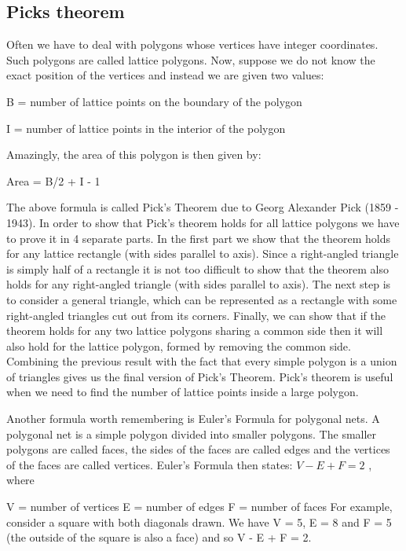 \documentclass[10pt,letterpaper,twocolumn,twosided]{article}
\newcommand{\codigofuente}[1]{

\dotfill
}
\begin{document}
\codigofuente{src/geom/circledistance.cpp}

\subsection{Picks theorem}

Often we have to deal with polygons whose vertices have integer coordinates. Such polygons are called lattice polygons. Now, suppose we do not know the exact position of the vertices and instead we are given two values:

B = number of lattice points on the boundary of the polygon

I = number of lattice points in the interior of the polygon

Amazingly, the area of this polygon is then given by:

Area = B/2 + I - 1

The above formula is called Pick's Theorem due to Georg Alexander Pick (1859 - 1943). In order to show that Pick's theorem holds for all lattice polygons we have to prove it in 4 separate parts. In the first part we show that the theorem holds for any lattice rectangle (with sides parallel to axis). Since a right-angled triangle is simply half of a rectangle it is not too difficult to show that the theorem also holds for any right-angled triangle (with sides parallel to axis). The next step is to consider a general triangle, which can be represented as a rectangle with some right-angled triangles cut out from its corners. Finally, we can show that if the theorem holds for any two lattice polygons sharing a common side then it will also hold for the lattice polygon, formed by removing the common side. Combining the previous result with the fact that every simple polygon is a union of triangles gives us the final version of Pick's Theorem. Pick's theorem is useful when we need to find the number of lattice points inside a large polygon. 

Another formula worth remembering is Euler's Formula for polygonal nets. A polygonal net is a simple polygon divided into smaller polygons. The smaller polygons are called faces, the sides of the faces are called edges and the vertices of the faces are called vertices. Euler's Formula then states:
$V - E + F = 2$ , where

V = number of vertices
E = number of edges
F = number of faces
For example, consider a square with both diagonals drawn. We have V = 5, E = 8 and F = 5 (the outside of the square is also a face) and so V - E + F = 2. 
\end{document}
